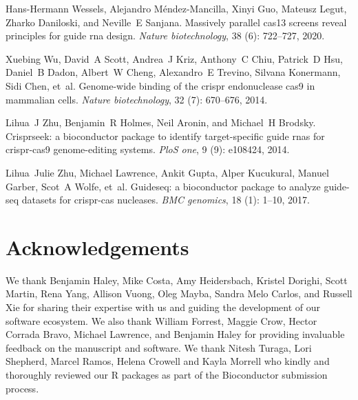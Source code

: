 \documentclass[pdftex,english,10pt]{article}
\begin{document}
{\begin{thebibliography}{105}
Hans-Hermann Wessels, Alejandro M{\'e}ndez-Mancilla, Xinyi Guo, Mateusz Legut,
  Zharko Daniloski, and Neville~E Sanjana.
\newblock Massively parallel cas13 screens reveal principles for guide rna
  design.
\newblock \emph{Nature biotechnology}, 38 (6): 722--727,
  2020.

Xuebing Wu, David~A Scott, Andrea~J Kriz, Anthony~C Chiu, Patrick~D Hsu,
  Daniel~B Dadon, Albert~W Cheng, Alexandro~E Trevino, Silvana Konermann, Sidi
  Chen, et~al.
\newblock Genome-wide binding of the crispr endonuclease cas9 in mammalian
  cells.
\newblock \emph{Nature biotechnology}, 32 (7): 670--676,
  2014.

Lihua~J Zhu, Benjamin~R Holmes, Neil Aronin, and Michael~H Brodsky.
\newblock Crisprseek: a bioconductor package to identify target-specific guide
  rnas for crispr-cas9 genome-editing systems.
\newblock \emph{PloS one}, 9 (9): e108424, 2014.

Lihua~Julie Zhu, Michael Lawrence, Ankit Gupta, Alper Kucukural, Manuel Garber,
  Scot~A Wolfe, et~al.
\newblock Guideseq: a bioconductor package to analyze guide-seq datasets for
  crispr-cas nucleases.
\newblock \emph{BMC genomics}, 18 (1): 1--10, 2017.

\end{thebibliography}




\section*{Acknowledgements}

We thank Benjamin Haley, Mike Costa, Amy Heidersbach, Kristel Dorighi, Scott Martin, Rena Yang, Allison Vuong, Oleg Mayba, Sandra Melo Carlos, and Russell Xie for sharing their expertise with us and guiding the development of our software ecosystem. We also thank William Forrest, Maggie Crow, Hector Corrada Bravo, Michael Lawrence, and Benjamin Haley for providing invaluable feedback on the manuscript and software. We thank Nitesh Turaga, Lori Shepherd, Marcel Ramos, Helena Crowell and Kayla Morrell who kindly and thoroughly reviewed our R packages as part of the Bioconductor submission process.


}
\end{document}

